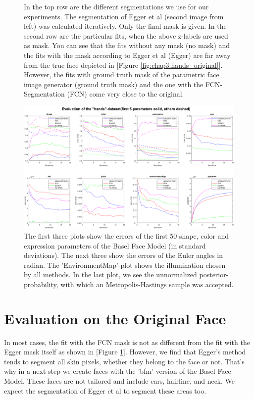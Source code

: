 \begin{figure}[H]
\begin{tabular}{m{1.3cm}|SC|SC|SC|SC}
	\end{tabular}
	\caption{In the top row are the different segmentations we use for our experiments. The segmentation of Egger et al (second image from left) was calculated iteratively. Only the final mask is given. In the second row are the particular fits, when the above z-labels are used as mask. You can see that the fits without any mask (no mask) and the fits with the mask according to Egger et al (Egger) are far away from the true face depicted in [Figure \ref{fig:chap3:hands_original}]. However, the fits with ground truth mask of the parametric face image generator (ground truth mask) and the one with the FCN-Segmentation (FCN) come very close to the original.}
	\label{fig:chap3:zlabelsandfits}
\end{figure}

\begin{figure}[H]
	\centering
	\includegraphics[angle=90,width=.55\textheight]{Figures/chap3/plot_hands_setting1.png}
	\caption{The first three plots show the errors of the first 50 shape, color and expression parameters of the Basel Face Model (in standard deviations). The next three show the errors of the Euler angles in radian. The 'EnvironmentMap'-plot shows the illumination chosen by all methods. In the last plot, we see the unnormalized posterior-probability, with which an Metropolis-Hastings sample was accepted.}
	\label{fig:chap3:plot_hands_setup1}
\end{figure}

\FloatBarrier

\section{Evaluation on the Original Face}
\label{sec:Oversegmentation}
In most cases, the fit with the FCN mask is not as different from the fit with the Egger mask itself as shown in [Figure \ref{fig:chap3:zlabelsandfits}]. However, we find that Egger's method tends to segment all skin pixels, whether they belong to the face or not. That's why in a next step we create faces with the 'bfm' version of the Basel Face Model. These faces are not tailored and include ears, hairline, and neck. We expect the segmentation of Egger et al to segment these areas too.

